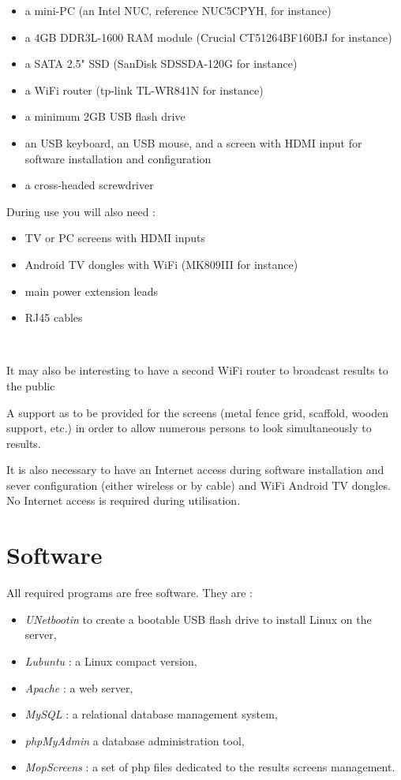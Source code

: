 \documentclass[a4paper]{ffco-rapport}
\begin{document}
	\begin{itemize}
		\item a mini-PC (an Intel NUC, reference NUC5CPYH, for instance)
		\item a 4GB DDR3L-1600 RAM module (Crucial CT51264BF160BJ for instance)
		\item a SATA 2.5" SSD (SanDisk SDSSDA-120G for instance)
		\item a WiFi router (tp-link TL-WR841N for instance)
		\item a minimum 2GB USB flash drive
		\item an USB keyboard, an USB mouse, and a screen with HDMI input for software installation and configuration
		\item a cross-headed screwdriver
	\end{itemize}

	During use you will also need :
	\begin{itemize}
		\item TV or PC screens with HDMI inputs
		\item Android TV dongles with WiFi (MK809III for instance)
		\item main power extension leads
		\item RJ45 cables
	\end{itemize}
	~
	
	It may also be interesting to have a second WiFi router to broadcast results to the public

	A support as to be provided for the screens (metal fence grid, scaffold, wooden support, etc.) in order to allow numerous persons to look simultaneously to results.

	It is also necessary to have an Internet access during software installation and sever configuration (either wireless or by cable) and WiFi Android TV dongles. No Internet access is required during utilisation.

\chapter{Software}
	All required programs are free software. They are :
	
	\begin{itemize}
		\item \emph{UNetbootin} to create a bootable USB flash drive to install Linux on the server,
		\item \emph{Lubuntu} : a Linux compact version,
		\item \emph{Apache} : a web server,
		\item \emph{MySQL} : a relational database management system,
		\item \emph{phpMyAdmin} a database administration tool,
		\item \emph{MopScreens} : a set of php files dedicated to the results screens management.
	\end{itemize}
\end{document}

